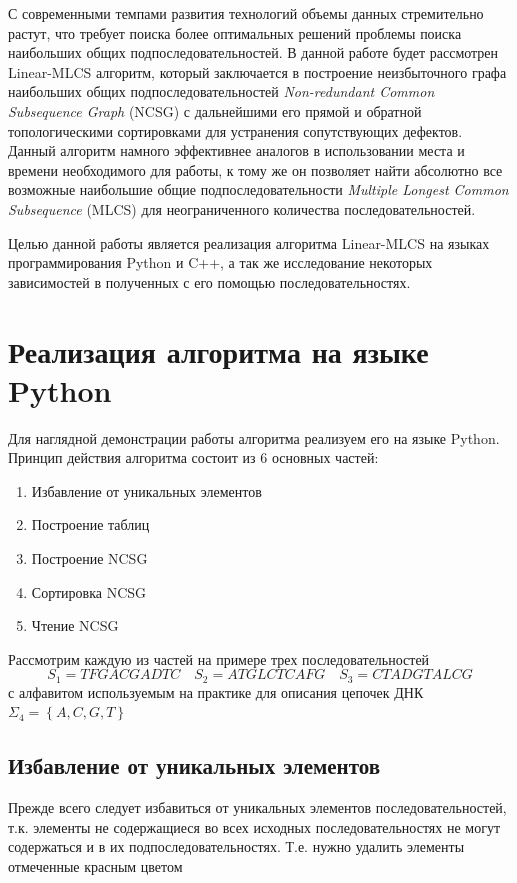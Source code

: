 \documentclass[a4paper,12pt]{extarticle}
\begin{document}
С современными темпами развития технологий объемы данных стремительно растут, что требует поиска более оптимальных решений проблемы поиска наибольших общих подпоследовательностей. В данной работе будет рассмотрен Linear-MLCS алгоритм, который заключается в построение неизбыточного графа наибольших общих подпоследовательностей \textit{Non-redundant Common Subsequence Graph} (NCSG) с дальнейшими его прямой и обратной топологическими сортировками для устранения сопутствующих дефектов. Данный алгоритм намного эффективнее аналогов в использовании места и времени необходимого для работы, к тому же он позволяет найти абсолютно все возможные наибольшие общие подпоследовательности \textit{Multiple Longest Common Subsequence} (MLCS) для неограниченного количества последовательностей.

Целью данной работы является реализация алгоритма Linear-MLCS на языках программирования Python и C++, а так же исследование некоторых зависимостей в полученных с его помощью последовательностях.

\section{Реализация алгоритма на языке Python}
Для наглядной демонстрации работы алгоритма реализуем его на языке Python.
Принцип действия алгоритма состоит из 6 основных частей:
\begin{enumerate}
  \item Избавление от уникальных элементов
  \item Построение таблиц
  \item Построение NCSG
  \item Сортировка NCSG
  \item Чтение NCSG
\end{enumerate}

Рассмотрим каждую из частей на примере трех последовательностей
\[S_{1} = TFGACGADTC \quad S_{2} = ATGLCTCAFG \quad S_{3} = CTADGTALCG\]
с алфавитом используемым на практике для описания цепочек ДНК $\Sigma_{4} = \left\{A, C, G, T\right\}$

\subsection{Избавление от уникальных элементов}
\label{preproc}

Прежде всего следует избавиться от уникальных элементов последовательностей, т.к. элементы не содержащиеся во всех исходных последовательностях не могут содержаться и в их подпоследовательностях. Т.е. нужно удалить элементы отмеченные красным цветом
\end{document}
